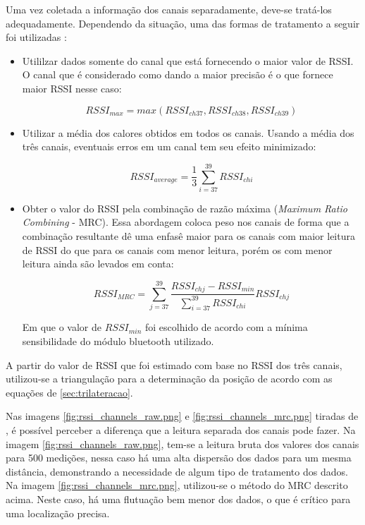 Uma vez coletada a informação dos canais separadamente, deve-se tratá-los adequadamente. Dependendo da situação, uma das formas de tratamento a seguir foi utilizadas :

\begin{itemize}

    \item Utililzar dados somente do canal que está fornecendo o maior valor de RSSI. O canal que é considerado como dando a maior precisão é o que fornece maior RSSI nesse caso:

    \begin{equation}
        RSSI_{max} = max(RSSI_{ch37}, RSSI_{ch38}, RSSI_{ch39})
    \end{equation}

    \item  Utilizar a média dos calores obtidos em todos os canais. Usando a média dos três canais, eventuais erros em um canal tem seu efeito minimizado:

    \begin{equation}
        RSSI_{average} = \frac{1}{3} \sum_{i=37}^{39}  RSSI_{ch i}
    \end{equation}


    \item Obter o valor do RSSI pela combinação de razão máxima (\textit{Maximum Ratio Combining} - MRC). Essa abordagem coloca peso nos canais de forma que a combinação resultante dê uma enfasê maior para os canais com maior leitura de RSSI do que para os canais com menor leitura, porém os com menor leitura ainda são levados em conta:

    \begin{equation}
        RSSI_{MRC} = \sum_{j=37}^{39} \frac{RSSI_{ch j} - RSSI_{min}}{\sum_{i=37}^{39}  RSSI_{ch i}} RSSI_{ch j}
    \end{equation}

    Em que o valor de \( RSSI_{min} \) foi escolhido de acordo com a mínima sensibilidade do módulo bluetooth utilizado.


\end{itemize}

A partir do valor de RSSI que foi estimado com base no RSSI dos três canais, utilizou-se a triangulação para a determinação da posição de acordo com as equações de \ref{sec:trilateracao}.

Nas imagens \ref{fig:rssi_channels_raw.png} e \ref{fig:rssi_channels_mrc.png} tiradas de \cite{art17}, é possível perceber a diferença que a leitura separada dos canais pode fazer. Na imagem \ref{fig:rssi_channels_raw.png}, tem-se a leitura bruta dos valores dos canais para 500 medições, nessa caso há uma alta dispersão dos dados para um mesma distância, demonstrando a necessidade de algum tipo de tratamento dos dados.
Na imagem \ref{fig:rssi_channels_mrc.png}, utilizou-se o método do MRC descrito acima. Neste caso, há uma flutuação bem menor dos dados, o que é crítico para uma localização precisa.

